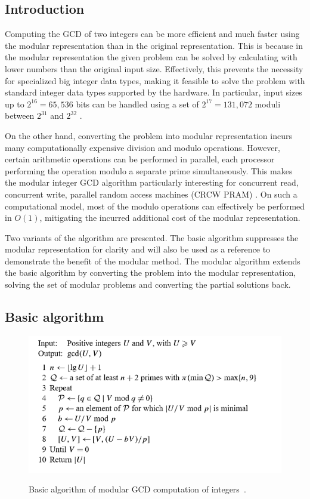 \subsection{Introduction}

Computing the GCD of two integers can be more efficient and much faster using the modular representation than in the original representation. This is because in the modular representation the given problem can be solved by calculating with lower numbers than the original input size. Effectively, this prevents the necessity for specialized big integer data types, making it feasible to solve the problem with standard integer data types supported by the hardware. In particular, input sizes up to $2^{16} = 65{,}536$ bits can be handled using a set of $2^{17} = 131{,}072$ moduli between $2^{31}$ and $2^{32}$ \cite{modularInteger}.

On the other hand, converting the problem into modular representation incurs many computationally expensive division and modulo operations. However, certain arithmetic operations can be performed in parallel, each processor performing the operation modulo a separate prime simultaneously. This makes the modular integer GCD algorithm particularly interesting for concurrent read, concurrent write, parallel random access machines (CRCW PRAM) \cite{modularInteger}. On such a computational model, most of the modulo operations can effectively be performed in $O(1)$, mitigating the incurred additional cost of the modular representation.

Two variants of the algorithm are presented. The basic algorithm suppresses the modular representation for clarity and will also be used as a reference to demonstrate the benefit of the modular method. The modular algorithm extends the basic algorithm by converting the problem into the modular representation, solving the set of modular problems and converting the partial solutions back.

\subsection{Basic algorithm}

\begin{figure}
\caption{Basic algorithm of modular GCD computation of integers~\cite{modularInteger}.}
\centering
\includegraphics[scale=0.6]{texfiles/Integer_mod_basic.PNG}
 \label{fig:BasicAlgorithm}
\end{figure}

